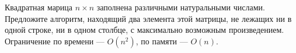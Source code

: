 \documentclass{article}
\begin{document}
Квадратная марица $n\times n$ заполнена различными натуральными числами. Предложите алгоритм, находящий два элемента этой матрицы, не лежащих 
ни в одной строке, ни в одном столбце, с максимально возможным произведением. Ограничение по времени --- $O(n^2)$, по памяти --- $O(n)$.
\end{document}
